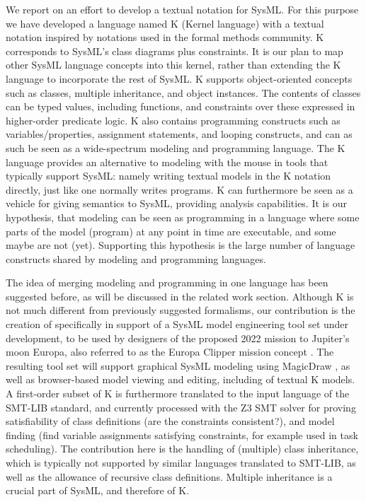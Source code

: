 We report on an effort to develop a textual notation for SysML. For
this purpose we have developed a language named K (Kernel language)
with a textual notation inspired by notations used in the formal
methods community.  K corresponds to SysML’s class diagrams plus
constraints. It is our plan to map other SysML language concepts into
this kernel, rather than extending the K language to incorporate the
rest of SysML. K supports object-oriented concepts such as classes,
multiple inheritance, and object instances. The contents of classes
can be typed values, including functions, and constraints over these
expressed in higher-order predicate logic.  K also contains
programming constructs such as variables/properties, assignment
statements, and looping constructs, and can as such be seen as a
wide-spectrum modeling and programming language.  The K language
provides an alternative to modeling with the mouse in tools that
typically support SysML: namely writing textual models in the K
notation directly, just like one normally writes programs. K can
furthermore be seen as a vehicle for giving semantics to SysML,
providing analysis capabilities. It is our hypothesis, that modeling
can be seen as programming in a language where some parts of the model
(program) at any point in time are executable, and some maybe are not
(yet). Supporting this hypothesis is the large number of language
constructs shared by modeling and programming languages.

The idea of merging modeling and programming in one language has been
suggested before, as will be discussed in the related work section.
Although K is not much different from previously suggested formalisms,
our contribution is the creation of \Klang{} specifically in support
of a SysML model engineering tool set under development, to be used by
designers of the proposed 2022 mission to Jupiter's moon Europa, also
referred to as the Europa Clipper mission concept
\cite{europa-clipper}.  The resulting tool set will support graphical
SysML modeling using MagicDraw \cite{magicdraw}, as well as
browser-based model viewing and editing, including of textual K
models. A first-order subset of K is furthermore translated to the
input language of the SMT-LIB standard, and currently processed with
the Z3 SMT solver for proving satisfiability of class definitions (are
the constraints consistent?), and model finding (find variable
assignments satisfying constraints, for example used in task
scheduling).  The contribution here is the handling of (multiple)
class inheritance, which is typically not supported by similar
languages translated to SMT-LIB, as well as the allowance of recursive
class definitions. Multiple inheritance is a crucial part of SysML,
and therefore of K.

